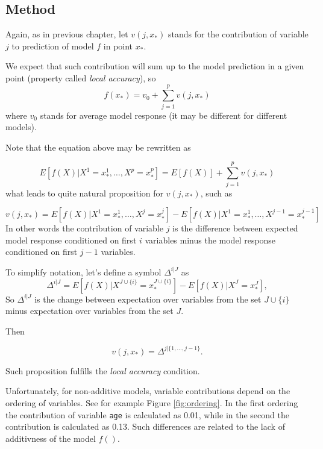 \documentclass[12pt,]{krantz}
\theoremstyle{definition}
\theoremstyle{definition}
\theoremstyle{definition}
\theoremstyle{remark}
\begin{document}
\hypertarget{method}{%
\subsection{Method}\label{method}}

Again, as in previous chapter, let \(v(j, x_*)\) stands for the
contribution of variable \(j\) to prediction of model \(f\) in point
\(x_*\).

We expect that such contribution will sum up to the model prediction in
a given point (property called \emph{local accuracy}), so \[
f(x_*) = v_0 + \sum_{j=1}^p v(j, x_*)
\] where \(v_0\) stands for average model response (it may be different
for different models).

Note that the equation above may be rewritten as

\[
E [f(X)|X^1 = x^1_*, \ldots, X^p = x^p_*] = E[f(X)] + \sum_{j=1}^p v(j, x_*)
\] what leads to quite natural proposition for \(v(j, x_*)\), such as

\[
v(j, x_*) = E [f(X) | X^1 = x^1_*, \ldots, X^j = x^j_*] - E [f(X) | X^1 = x^1_*, \ldots, X^{j-1} = x^{j-1}_*] 
\] In other words the contribution of variable \(j\) is the difference
between expected model response conditioned on first \(i\) variables
minus the model response conditioned on first \(j-1\) variables.

To simplify notation, let's define a symbol \(\Delta^{i|J}\) as \[
\Delta^{i|J} = E [f(X) | X^{J \cup \{i\}} = x^{J \cup \{i\}}_*] - E [f(X) | X^{J} = x^{J}_*],
\] So \(\Delta^{i|J}\) is the change between expectation over variables
from the set \(J \cup \{i\}\) minus expectation over variables from the
set \(J\).

Then

\[
v(j, x_*) = \Delta^{j|\{1,  ..., j-1\}}.
\]

Such proposition fulfills the \emph{local accuracy} condition.

Unfortunately, for non-additive models, variable contributions depend on
the ordering of variables. See for example Figure \ref{fig:ordering}. In
the first ordering the contribution of variable \texttt{age} is
calculated as 0.01, while in the second the contribution is calculated
as 0.13. Such differences are related to the lack of additivness of the
model \(f()\).
\end{document}
